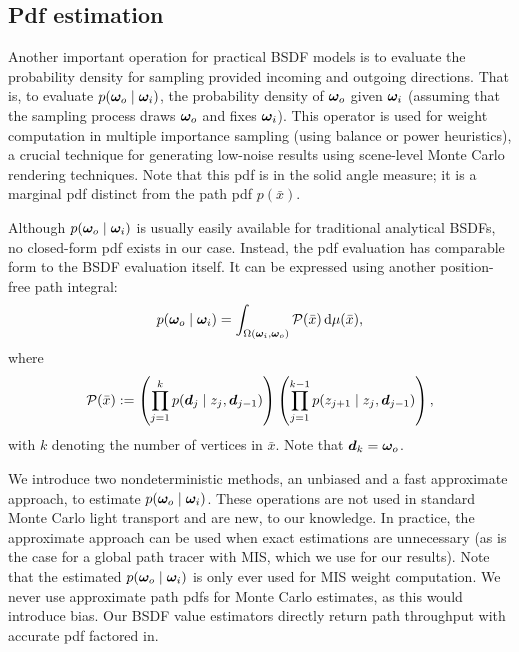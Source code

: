 \subsection{Pdf estimation}
\label{subsec:ours_pdf}

Another important operation for practical BSDF models is to evaluate the probability density for sampling provided incoming and outgoing directions.
That is, to evaluate $p(\bm{\omega}_o \;|\; \bm{\omega}_i)$, the probability density of $\bm{\omega}_o$ given $\bm{\omega}_i$ (assuming that the sampling process draws $\bm{\omega}_o$ and fixes $\bm{\omega}_i$).
This operator is used for weight computation in multiple importance sampling (using balance or power heuristics), a crucial technique for generating low-noise results using scene-level Monte Carlo rendering techniques. Note that this pdf is in the solid angle measure; it is a marginal pdf distinct from the path pdf $p(\bar x)$.

Although $p(\bm{\omega}_o \;|\; \bm{\omega}_i)$ is usually easily available for traditional analytical BSDFs, no closed-form pdf exists in our case. Instead, the pdf evaluation has comparable form to the BSDF evaluation itself. It can be expressed using another position-free path integral:
\begin{equation}
	\label{eqn:ours_pdf}
	p(\bm{\omega}_o \;|\; \bm{\omega}_i) = \int_{\Omega(\bm{\omega}_i, \bm{\omega}_o)} \mathcal{P}(\bar{x}) \,\mathrm{d}\mu(\bar{x}),
\end{equation}
where
\begin{equation}
	\mathcal{P}(\bar{x}) := \left(\prod_{j = 1}^k p(\bm{d}_j \;|\; z_j, \bm{d}_{j - 1})\right) \left(\prod_{j = 1}^{k - 1} p(z_{j + 1} \;|\; z_j, \bm{d}_{j - 1})\right),
\end{equation}
with $k$ denoting the number of vertices in $\bar{x}$. Note that $\bm{d}_k = \bm{\omega}_o$.

We introduce two nondeterministic methods, an unbiased and a fast approximate approach, to estimate $p(\bm{\omega}_o \;|\; \bm{\omega}_i)$.
These operations are not used in standard Monte Carlo light transport and are new, to our knowledge.
In practice, the approximate approach can be used when exact estimations are unnecessary (as is the case for a global path tracer with MIS, which we use for our results).
Note that the estimated $p(\bm{\omega}_o \;|\; \bm{\omega}_i)$ is only ever used for MIS weight computation.
We never use approximate path pdfs for Monte Carlo estimates, as this would introduce bias.
Our BSDF value estimators directly return path throughput with accurate pdf factored in.

